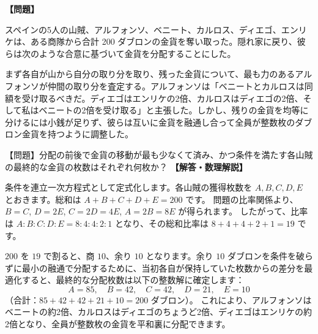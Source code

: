 \documentclass[10pt,a4paper,oneside,openany]{ltjsbook}
\begin{document}
\begin{tcolorbox}[colback=softblue,colframe=primaryblue,title=\textbf{第 133 問：五人の山賊の金貨分配 （原題: THE FIVE BRIGANDS.）},arc=2mm,boxrule=1pt,breakable]
\textbf{【問題】}\par\vspace{0.3em}
スペインの5人の山賊、アルフォンソ、ベニート、カルロス、ディエゴ、エンリケは、ある商隊から合計 200 ダブロンの金貨を奪い取った。隠れ家に戻り、彼らは次のような合意に基づいて金貨を分配することにした。

まず各自が山から自分の取り分を取り、残った金貨について、最も力のあるアルフォンソが仲間の取り分を査定する。アルフォンソは「ベニートとカルロスは同額を受け取るべきだ。ディエゴはエンリケの2倍、カルロスはディエゴの2倍、そして私はベニートの2倍を受け取る」と主張した。しかし、残りの金貨を均等に分けるには小銭が足りず、彼らは互いに金貨を融通し合って全員が整数枚のダブロン金貨を持つように調整した。

【問題】分配の前後で金貨の移動が最も少なくて済み、かつ条件を満たす各山賊の最終的な金貨の枚数はそれぞれ何枚か？
\tcblower
\textbf{【解答・数理解説】}\par\vspace{0.3em}
条件を連立一次方程式として定式化します。各山賊の獲得枚数を $A, B, C, D, E$ とおきます。総和は $A + B + C + D + E = 200$ です。
問題の比率関係より、$B = C$, $D = 2E$, $C = 2D = 4E$, $A = 2B = 8E$ が得られます。
したがって、比率は $A:B:C:D:E = 8:4:4:2:1$ となり、その総和比率は $8+4+4+2+1 = 19$ です。

$200$ を $19$ で割ると、商 $10$、余り $10$ となります。余り $10$ ダブロンを条件を破らずに最小の融通で分配するために、当初各自が保持していた枚数からの差分を最適化すると、最終的な分配枚数は以下の整数解に確定します：
\[ A = 85,\quad B = 42,\quad C = 42,\quad D = 21,\quad E = 10 \]
（合計：$85 + 42 + 42 + 21 + 10 = 200$ ダブロン）。
これにより、アルフォンソはベニートの約2倍、カルロスはディエゴのちょうど2倍、ディエゴはエンリケの約2倍となり、全員が整数枚の金貨を平和裏に分配できます。
\end{tcolorbox}
\end{document}
